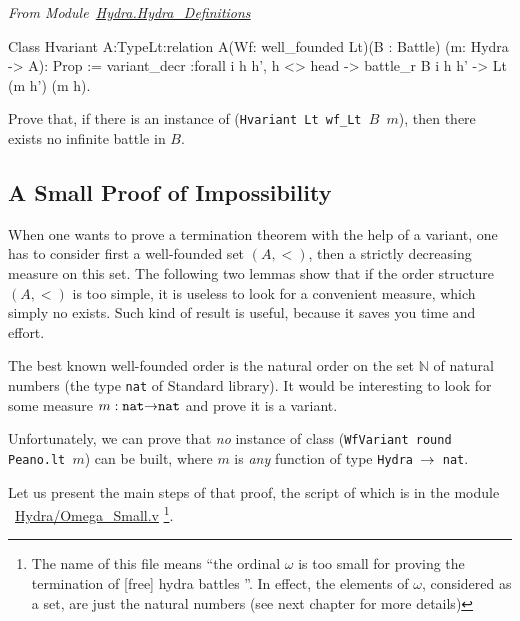 \vspace{4pt}
\emph{From Module~\href{../theories/html/hydras.Hydra.Hydra_Definitions.html\#Hvariant}{Hydra.Hydra\_Definitions}}


\label{sect:hvariant-def}

\begin{Coqsrc}
Class Hvariant {A:Type}{Lt:relation A}(Wf: well_founded Lt)(B : Battle)
  (m: Hydra -> A):   Prop :=
  {variant_decr :forall i h h',
      h <> head ->
      battle_r  B i  h h' -> Lt (m h') (m h)}.
\end{Coqsrc}  


\begin{exercise}
 Prove that, if there is an instance of (\texttt{Hvariant Lt wf\_Lt $B$ $m$}), then there exists no infinite battle in  $B$.
\end{exercise}




\subsection{A  Small Proof of Impossibility}

\label{omega-case}

When one wants to prove a termination theorem with the help of a variant, 
one has to consider first a well-founded set $(A,<)$, then a strictly decreasing measure on this set.  The following two lemmas show that if  the order structure $(A,<)$ is too simple, it is useless to look for a convenient measure, which simply no exists. Such kind of result is useful, because it saves you time and effort.


The best known well-founded order is the natural order on the set $\mathbb{N}$ of natural numbers (the type \texttt{nat} of Standard library). It would be interesting to look for some measure $m:\texttt{nat}\mbox{$\rightarrow$}\texttt{nat}$ and prove it is a variant.

Unfortunately, we can prove that 
\emph{no} instance of class (\texttt{WfVariant round Peano.lt $m$}) can be built, where
$m$ is \emph{any} function of type \texttt{Hydra $\mbox{$\rightarrow$}$ nat}.


Let us present the main steps of that proof, the script of which  is in the module ~\href{../theories/html/hydras.Hydra.Omega_Small.html}{Hydra/Omega\_Small.v} \footnote{ The name of this file means ``the ordinal $\omega$ is too small for proving the termination of [free] hydra battles ''. In effect, the elements of $\omega$, considered as a set, are just the natural numbers (see next chapter for more details)}.

